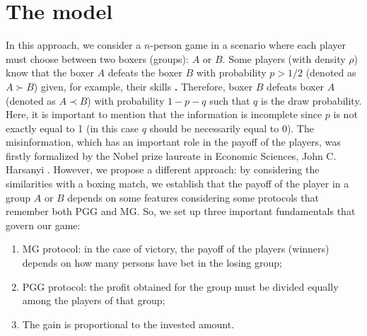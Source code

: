 \documentclass[3p, 11pt]{elsarticle}
\begin{document}
\section{The model}

\label{Sec:Model}

In this approach, we consider a $n$-person game in a scenario where each
player must choose between two boxers (groups): $A$ or $B$. Some players
(with density $\rho $) know that the boxer $A$ defeats the boxer $B$ with
probability $p>1/2$ (denoted as $A\succ B$) given, for example, their skills%
\textbf{. }Therefore, boxer $B$ defeats boxer $A$ (denoted as $A\prec B$)
with probability $1-p-q$ such that $q$ is the draw probability. Here, it is
important to mention that the information is incomplete since $p$ is not
exactly equal to 1 (in this case $q$ should be necessarily equal to $0$).
The misinformation, which has an important role in the payoff of the
players, was firstly formalized by the Nobel prize laureate in Economic
Sciences, John C. Harsanyi \cite{Harsanyi}. However, we propose a different
approach: by considering the similarities with a boxing match, we establish
that the payoff of the player in a group $A$ or $B$ depends on some features
considering some protocols that remember both PGG and MG. So, we set up
three important fundamentals that govern our game:

\begin{enumerate}
\item MG protocol: in the case of victory, the payoff of the players
(winners) depends on how many persons have bet in the losing group;

\item PGG protocol: the profit obtained for the group must be divided
equally among the players of that group;

\item The gain is proportional to the invested amount.
\end{enumerate}
\end{document}
